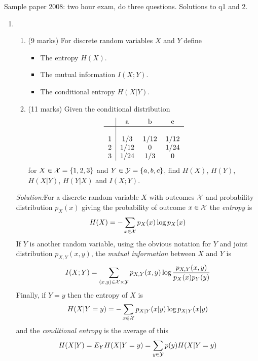 \documentclass[12pt]{article}
\newcommand{\soln}{\noindent\textit{Solution:}}
\begin{document}
Sample paper 2008: two hour exam, do three questions. Solutions to q1 and 2.

\begin{enumerate}
\item %
\begin{enumerate}
\item (9 marks) For discrete random variables $X$ and $Y$ define
\begin{itemize}
\item The entropy $H(X)$.
\item The mutual information $I(X;Y)$.
\item The conditional entropy $H(X|Y)$.
\end{itemize}
\item (11 marks) Given the conditional distribution
$$
\begin{tabular}{c|ccc}
&a&b&c\\
\hline\\
1&1/3&1/12&1/12\\
2&1/12&0&1/24\\
3&1/24&1/3&0
\end{tabular}
$$ for $X\in{\cal X}=\{1,2,3\}$ and $Y\in{\cal Y}=\{a,b,c\}$, find
$H(X)$, $H(Y)$, $H(X|Y)$, $H(Y|X)$ and $I(X;Y)$.

\end{enumerate}

\soln For a discrete random variable $X$ with outcomes ${\cal X}$ and probability distribution $p_X(x)$ giving the probability of outcome $x\in{\cal X}$ the {\sl entropy} is
\begin{equation}
H(X)=-\sum_{x\in {\cal X}}p_X(x)\log{p_X(x)}
\end{equation}
If $Y$ is another random variable, using the obvious notation for $Y$ and joint distribution $p_{X,Y}(x,y)$, the {\sl mutual information} between $X$ and $Y$ is
\begin{equation}
I(X;Y)=\sum_{(x,y)\in{\cal X}\times{\cal Y}}p_{X,Y}(x,y)\log{\frac{p_{X,Y}(x,y)}{p_X(x)p_Y(y)}}
\end{equation}
Finally, if $Y=y$ then the entropy of $X$ is
\begin{equation}
H(X|Y=y)=-\sum_{x\in {\cal X}}p_{X|Y}(x|y)\log{p_{X|Y}(x|y)}
\end{equation}
and the {\sl conditional entropy} is the average of this
\begin{equation}
H(X|Y)=E_YH(X|Y=y)=\sum_{y\in{\cal Y}}p(y)H(X|Y=y)
\end{equation}


\end{enumerate}
\end{document}
